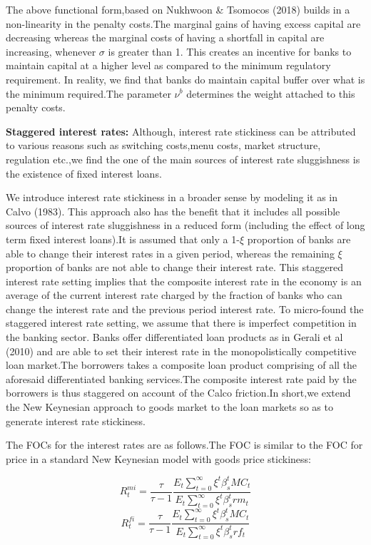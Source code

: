 \documentclass[12pt]{article}
\numberwithin{equation}{section}
\begin{document}
The above functional form,based on Nukhwoon \& Tsomocos (2018) builds in a non-linearity in the penalty costs.The marginal gains of having excess capital are decreasing whereas the marginal costs of having a shortfall in capital are increasing, whenever $\sigma$ is greater than 1. This creates an incentive for banks to maintain capital at a higher level as compared to the minimum regulatory requirement. In reality, we find that banks do maintain capital buffer over what is the minimum required.The parameter $\nu^b$ determines the weight attached to this penalty costs.

\textbf{Staggered interest rates:}
Although, interest rate stickiness can be attributed to various reasons such as switching costs,menu costs, market structure, regulation etc.,we find the one of the main sources of interest rate sluggishness is the existence of fixed interest loans.

We introduce interest rate stickiness in a broader sense by modeling it as in Calvo (1983). This approach also has the benefit that it includes all possible sources of interest rate sluggishness in a reduced form (including the effect of long term fixed interest loans).It is assumed that only a 1-$\xi$ proportion of banks are able to change their interest rates in a given period, whereas the remaining $\xi$ proportion of banks are not able to change their interest rate. This staggered interest rate setting implies that the composite interest rate in the economy is an average of the current interest rate charged by the fraction of banks who can change the interest rate and the previous period interest rate.
To micro-found the staggered interest rate setting, we assume that there is imperfect competition in the banking sector. Banks offer differentiated loan products as in Gerali et al (2010) and are able to set their interest rate in the monopolistically competitive loan market.The borrowers takes a composite loan product comprising of all the aforesaid differentiated banking services.The composite interest rate paid by the borrowers is thus staggered on account of the Calco friction.In short,we extend the New Keynesian approach to goods market to the loan markets so as to generate interest rate stickiness. 

The FOCs for the interest rates are as follows.The FOC is similar to the FOC for price in a standard New Keynesian model with goods price stickiness:

\begin{equation}
R^{mi}_t=\frac{\tau}{\tau-1}\frac{E_t\sum _{t=0}^{\infty }\xi^t\beta_{s}^t MC_t}{E_t\sum _{t=0}^{\infty }\xi^t\beta_{s}^t rm_t}
\end{equation}
\begin{equation}
R^{fi}_t=\frac{\tau}{\tau-1}\frac{E_t\sum _{t=0}^{\infty }\xi^t\beta_{s}^t MC_t}{E_t\sum _{t=0}^{\infty }\xi^t\beta_{s}^t rf_t}
\end{equation}
\end{document}
